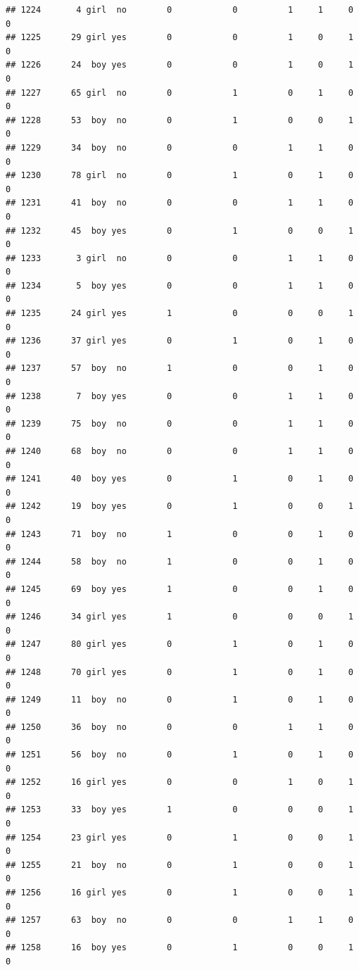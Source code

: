 \documentclass[man]{apa6}
\begin{document}
\begin{verbatim}
## 1224       4 girl  no        0            0          1     1     0     0
## 1225      29 girl yes        0            0          1     0     1     0
## 1226      24  boy yes        0            0          1     0     1     0
## 1227      65 girl  no        0            1          0     1     0     0
## 1228      53  boy  no        0            1          0     0     1     0
## 1229      34  boy  no        0            0          1     1     0     0
## 1230      78 girl  no        0            1          0     1     0     0
## 1231      41  boy  no        0            0          1     1     0     0
## 1232      45  boy yes        0            1          0     0     1     0
## 1233       3 girl  no        0            0          1     1     0     0
## 1234       5  boy yes        0            0          1     1     0     0
## 1235      24 girl yes        1            0          0     0     1     0
## 1236      37 girl yes        0            1          0     1     0     0
## 1237      57  boy  no        1            0          0     1     0     0
## 1238       7  boy yes        0            0          1     1     0     0
## 1239      75  boy  no        0            0          1     1     0     0
## 1240      68  boy  no        0            0          1     1     0     0
## 1241      40  boy yes        0            1          0     1     0     0
## 1242      19  boy yes        0            1          0     0     1     0
## 1243      71  boy  no        1            0          0     1     0     0
## 1244      58  boy  no        1            0          0     1     0     0
## 1245      69  boy yes        1            0          0     1     0     0
## 1246      34 girl yes        1            0          0     0     1     0
## 1247      80 girl yes        0            1          0     1     0     0
## 1248      70 girl yes        0            1          0     1     0     0
## 1249      11  boy  no        0            1          0     1     0     0
## 1250      36  boy  no        0            0          1     1     0     0
## 1251      56  boy  no        0            1          0     1     0     0
## 1252      16 girl yes        0            0          1     0     1     0
## 1253      33  boy yes        1            0          0     0     1     0
## 1254      23 girl yes        0            1          0     0     1     0
## 1255      21  boy  no        0            1          0     0     1     0
## 1256      16 girl yes        0            1          0     0     1     0
## 1257      63  boy  no        0            0          1     1     0     0
## 1258      16  boy yes        0            1          0     0     1     0

\end{verbatim}
\end{document}
